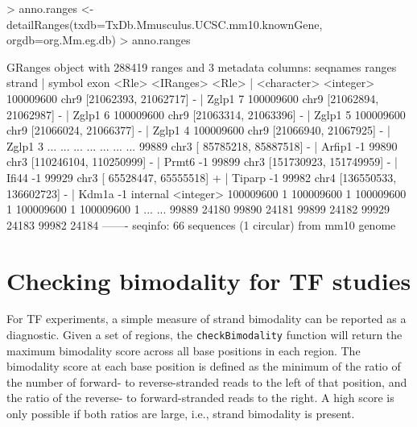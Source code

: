 \documentclass[12pt]{report}
\renewenvironment{Schunk}{\vspace{0pt}}{\vspace{0pt}}
\newcommand{\code}[1]{{\small\texttt{#1}}}
\begin{document}
\begin{Schunk}
\begin{Sinput}
> anno.ranges <- detailRanges(txdb=TxDb.Mmusculus.UCSC.mm10.knownGene, orgdb=org.Mm.eg.db)
> anno.ranges
\end{Sinput}
\begin{Soutput}
GRanges object with 288419 ranges and 3 metadata columns:
            seqnames                 ranges strand   |      symbol      exon
               <Rle>              <IRanges>  <Rle>   | <character> <integer>
  100009600     chr9   [21062393, 21062717]      -   |       Zglp1         7
  100009600     chr9   [21062894, 21062987]      -   |       Zglp1         6
  100009600     chr9   [21063314, 21063396]      -   |       Zglp1         5
  100009600     chr9   [21066024, 21066377]      -   |       Zglp1         4
  100009600     chr9   [21066940, 21067925]      -   |       Zglp1         3
        ...      ...                    ...    ... ...         ...       ...
      99889     chr3 [ 85785218,  85887518]      -   |      Arfip1        -1
      99890     chr3 [110246104, 110250999]      -   |       Prmt6        -1
      99899     chr3 [151730923, 151749959]      -   |       Ifi44        -1
      99929     chr3 [ 65528447,  65555518]      +   |      Tiparp        -1
      99982     chr4 [136550533, 136602723]      -   |       Kdm1a        -1
             internal
            <integer>
  100009600         1
  100009600         1
  100009600         1
  100009600         1
  100009600         1
        ...       ...
      99889     24180
      99890     24181
      99899     24182
      99929     24183
      99982     24184
  -------
  seqinfo: 66 sequences (1 circular) from mm10 genome
\end{Soutput}
\end{Schunk}

\section{Checking bimodality for TF studies}
For TF experiments, a simple measure of strand bimodality can be reported as a diagnostic.
Given a set of regions, the \code{checkBimodality} function will return the maximum bimodality score across all base positions in each region.
The bimodality score at each base position is defined as the minimum of the ratio of the number of forward- to reverse-stranded reads to the left of that position, and the ratio of the reverse- to forward-stranded reads to the right.
A high score is only possible if both ratios are large, i.e., strand bimodality is present.
\end{document}
